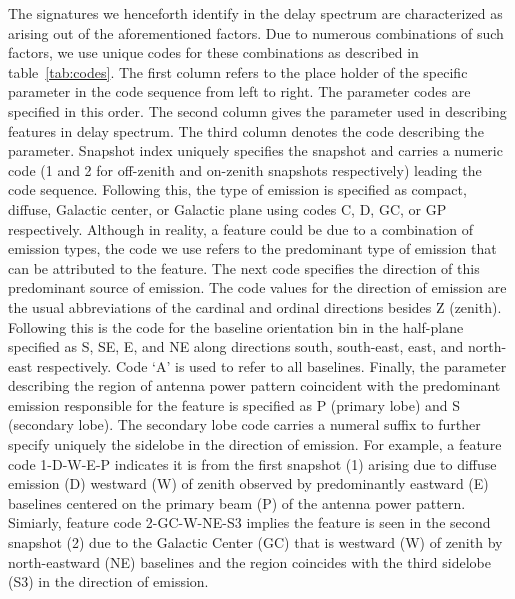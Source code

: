 \documentclass[preprint2,iop,numberedappendix]{emulateapj}
\begin{document}
The signatures we henceforth identify in the delay spectrum are characterized as arising out of the aforementioned factors. Due to numerous combinations of such factors, we use unique codes for these combinations as described in table~\ref{tab:codes}. The first column refers to the place holder of the specific parameter in the code sequence from left to right. The parameter codes are specified in this order. The second column gives the parameter used in describing features in delay spectrum. The third column denotes the code describing the parameter. Snapshot index uniquely specifies the snapshot and carries a numeric code (1 and 2 for off-zenith and on-zenith snapshots respectively) leading the code sequence. Following this, the type of emission is specified as compact, diffuse, Galactic center, or Galactic plane using codes C, D, GC, or GP respectively. Although in reality, a feature could be due to a combination of emission types, the code we use refers to the predominant type of emission that can be attributed to the feature. The next code specifies the direction of this predominant source of emission. The code values for the direction of emission are the usual abbreviations of the cardinal and ordinal directions besides Z (zenith). Following this is the code for the baseline orientation bin in the half-plane specified as S, SE, E, and NE along directions south, south-east, east, and north-east respectively. Code `A' is used to refer to all baselines. Finally, the parameter describing the region of antenna power pattern coincident with the predominant emission responsible for the feature is specified as P (primary lobe) and S (secondary lobe). The secondary lobe code carries a numeral suffix to further specify uniquely the sidelobe in the direction of emission. For example, a feature code 1-D-W-E-P indicates it is from the first snapshot (1) arising due to diffuse emission (D) westward (W) of zenith observed by predominantly eastward (E) baselines centered on the primary beam (P) of the antenna power pattern. Simiarly, feature code 2-GC-W-NE-S3 implies the feature is seen in the second snapshot (2) due to the Galactic Center (GC) that is westward (W) of zenith by north-eastward (NE) baselines and the region coincides with the third sidelobe (S3) in the direction of emission.
\end{document}
